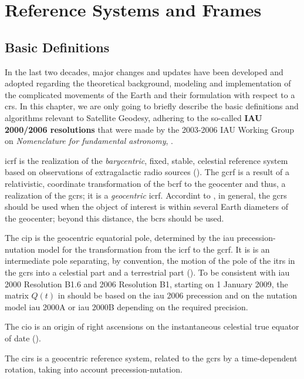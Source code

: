 \chapter{Reference Systems and Frames}
\label{ch:reference-systems-frames}

\section{Basic Definitions}
\label{sec:basic-definitions}
In the last two decades, major changes and updates have been developed and adopted 
regarding the theoretical background, modeling and implementation of the 
complicated movements of the Earth and their formulation with respect to a 
\gls{crs}. In this chapter, we are only going to briefly describe the basic 
definitions and algorithms relevant to Satellite Geodesy, adhering to the 
so-called \textbf{IAU 2000/2006 resolutions} that were made by the 2003-2006 
IAU Working Group on \emph{Nomenclature for fundamental astronomy}, \cite{Capitaine2006}.

\gls{icrf} is the realization of the \emph{barycentric}, fixed, stable, celestial 
reference system based on observations of extragalactic radio sources 
(\cite{Gurfil18}). The \gls{gcrf} is a result of a relativistic, coordinate 
transformation of the \gls{bcrf} to the geocenter and thus, a realization of the 
\gls{gcrs}; it is a \emph{geocentric} \gls{icrf}. Accordint to \cite{esaa13}, in 
general, the \gls{gcrs} should be used when the object of interest is within 
several Earth diameters of the geocenter; beyond this distance, the \gls{bcrs} 
should be used.

The \gls{cip} is the geocentric equatorial pole, determined by the \gls{iau} 
precession-nutation model for the transformation from the \gls{icrf} to the 
\gls{gcrf}. It is is an intermediate pole separating, by convention, the motion 
of the pole of the \gls{itrs} in the \gls{gcrs} into a celestial part and a 
terrestrial part (\cite{iers2010}). To be consistent with \gls{iau} 2000 Resolution 
B1.6 and 2006 Resolution B1, starting on 1 January 2009, the matrix \(Q(t)\) in 
\label{eq:tn3651} should be based on the \gls{iau} 2006 precession and on the 
nutation model \gls{iau} 2000A or \gls{iau} 2000B depending on the required 
precision.

The \gls{cio} is an 
origin of right ascensions on the instantaneous celestial true equator of date 
(\cite{Gurfil18}).

The \gls{cirs} is a geocentric reference system, related to the \gls{gcrs} by a 
time-dependent rotation, taking into account precession-nutation. 

